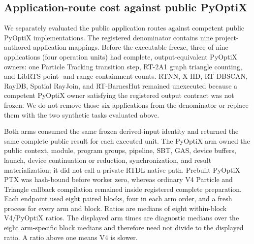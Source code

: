 \subsection{Application-route cost against public PyOptiX}
\label{sec:app-extension}

We separately evaluated the public application routes against competent public
PyOptiX implementations.  The registered denominator contains nine
project-authored application mappings.  Before the executable freeze, three of nine
applications (four operation units) had complete, output-equivalent PyOptiX
owners: one Particle Tracking transition step, RT-2A1 graph triangle counting,
and LibRTS point- and range-containment counts.  RTNN, X-HD, RT-DBSCAN, RayDB,
Spatial RayJoin, and RT-BarnesHut remained unexecuted because a competent
PyOptiX owner satisfying the registered output contract was not frozen.  We do
not remove those six applications from the denominator or replace them with
the two synthetic tasks evaluated above.

Both arms consumed the same frozen derived-input identity and returned the same
complete public result for each executed unit.  The PyOptiX arm owned the
public context, module, program groups, pipeline, SBT, GAS, device buffers,
launch, device continuation or reduction, synchronization, and result
materialization; it did not call a private RTDL native path.  Prebuilt PyOptiX
PTX was hash-bound before worker zero, whereas ordinary V4 Particle and
Triangle callback compilation remained inside registered complete preparation.
Each endpoint used eight paired blocks, four in each arm order, and a fresh
process for every arm and block.  Ratios are medians of eight within-block
V4/PyOptiX ratios.  The displayed arm times are diagnostic medians over the
eight arm-specific block medians and therefore need not divide to the displayed
ratio.  A ratio above one means V4 is slower.

